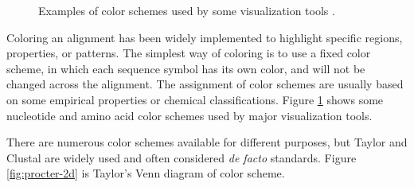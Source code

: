 \begin{figure}[hbt]
\centering
{}
\caption[Some Nucleotide and Amino Acid Color Schemes]{Examples of color schemes used by some visualization tools \cite{Procter2010aa}.}\label{fig:procter-2bc}
\end{figure}

Coloring an alignment has been widely implemented to highlight specific regions, properties, or patterns. The simplest way of coloring is to use a fixed color scheme, in which each sequence symbol has its own color, and will not be changed across the alignment. The assignment of color schemes are usually based on some empirical properties or chemical classifications. Figure \ref{fig:procter-2bc} shows some nucleotide and amino acid color schemes used by major visualization tools.

There are numerous color schemes available for different purposes, but Taylor \cite{LIN2002361} and Clustal \cite{Thompsonaa} are widely used and often considered \emph{de facto} standards. Figure \ref{fig:procter-2d} is Taylor's Venn diagram of color scheme.

